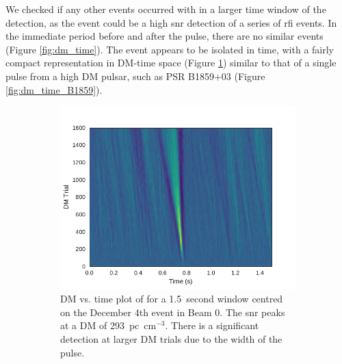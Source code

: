 \documentclass[a4paper,fleqn,usenatbib]{mnras}
\begin{document}
We checked if any other events occurred with in a larger time window of the
detection, as the event could be a high \gls{snr} detection of a series of
\gls{rfi} events.  In the immediate period before and after the pulse, there are
no similar events (Figure \ref{fig:dm_time}). The event appears to be isolated
in time, with a fairly compact representation in DM-time space (Figure
\ref{fig:dm_time_event}) similar to that of a single pulse from a high DM
pulsar, such as PSR B1859+03 (Figure \ref{fig:dm_time_B1859}).

\begin{figure}
    \centering
    \begin{subfigure}[t]{0.5\textwidth}
        \centering\captionsetup{width=.95\linewidth}
        \includegraphics[width=1.0\textwidth]{figures/D20161204_dmtrials_buf23_Beam0.pdf}
        \caption{DM vs. time plot of for a 1.5~second window centred on the
        December 4th event in Beam 0. The \gls{snr} peaks at a DM of
        293~pc~cm$^{-3}$. There is a significant detection at larger DM trials
        due to the width of the pulse.
        }
        \label{fig:dm_time_event}
    \end{subfigure}
    \begin{subfigure}[t]{0.5\textwidth}
        \centering\captionsetup{width=.95\linewidth}

\end{subfigure}
\end{figure}
\end{document}
